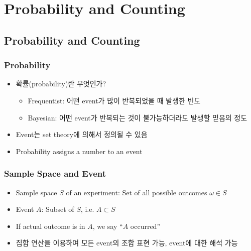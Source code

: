 \section{Probability and Counting}

\subsection{Probability and Counting}

\subsubsection*{Probability}
\begin{itemize}
    \item 확률(probability)란 무엇인가?
    \begin{itemize}
        \item Frequentist: 어떤 event가 많이 반복되었을 때 발생한 빈도
        \item Bayesian: 어떤 event가 반복되는 것이 불가능하더라도 발생할 믿음의 정도
    \end{itemize}
    \item Event는 set theory에 의해서 정의될 수 있음
    \item Probability assigns a number to an event
\end{itemize}

\subsubsection*{Sample Space and Event}
\begin{itemize}
    \item Sample space $S$ of an experiment: Set of all possible outcomes $\omega\in S$
    \item Event $A$: Subset of $S$, i.e. $A\subset S$
    \item If actual outcome is in $A$, we say ``$A$ occurred''
    \item 집합 연산을 이용하여 모든 event의 조합 표현 가능, event에 대한 해석 가능
\end{itemize}

